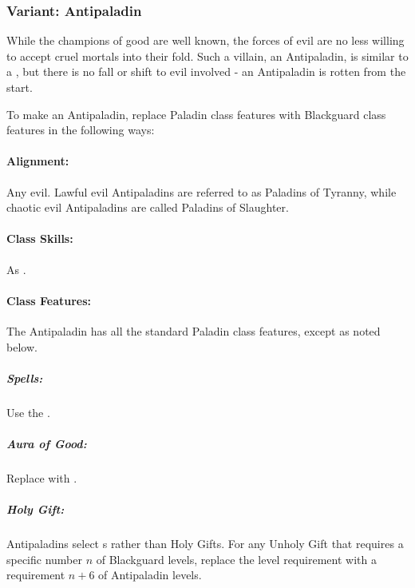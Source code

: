 \subsubsection[Antipaladin]{Variant: Antipaladin}
While the champions of good are well known, the forces of evil are no less willing to accept cruel mortals into their fold. Such a villain, an Antipaladin, is similar to a , but there is no fall or shift to evil involved - an Antipaladin is rotten from the start. 

To make an Antipaladin, replace Paladin class features with Blackguard class features in the following ways:

\paragraph{Alignment:} Any evil. Lawful evil Antipaladins are referred to as Paladins of Tyranny, while chaotic evil Antipaladins are called Paladins of Slaughter.
\paragraph{Class Skills:} As .

\paragraph{Class Features:}
The Antipaladin has all the standard Paladin class features, except as noted below.

\subparagraph{Spells:} Use the .
\subparagraph{Aura of Good:} Replace with .
\subparagraph{Holy Gift:} Antipaladins select s rather than Holy Gifts. For any Unholy Gift that requires a specific number $n$ of Blackguard levels, replace the level requirement with a requirement $n+6$ of Antipaladin levels.



